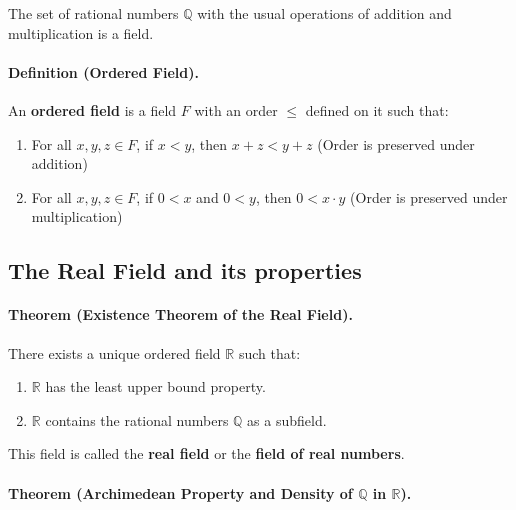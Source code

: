 \documentclass[openany]{book}
\numberwithin{equation}{section}
\begin{document}
        The set of rational numbers $\mathbb{Q}$ with the usual operations of addition and multiplication is a field.
    \par
\par
\paragraph{Definition (Ordered Field).}

    An \textbf{ordered field} is a field $F$ with an order $\leq$ defined on it such that:
    \begin{enumerate}
        \item For all $x, y, z \in F$, if $x < y$, then $x + z < y + z$ (Order is preserved under addition)
        \item For all $x, y, z \in F$, if $0 < x$ and $0 < y$, then $0 < x \cdot y$ (Order is preserved under multiplication)
    \end{enumerate}
\par
\subsection{The Real Field and its properties}
\paragraph{Theorem (Existence Theorem of the Real Field).}

    There exists a unique ordered field $\mathbb{R}$ such that:
    \begin{enumerate}
        \item $\mathbb{R}$ has the least upper bound property.
        \item $\mathbb{R}$ contains the rational numbers $\mathbb{Q}$ as a subfield.
    \end{enumerate}
    This field is called the \textbf{real field} or the \textbf{field of real numbers}.
\par
\paragraph{Theorem (Archimedean Property and Density of $\mathbb{Q}$ in $\mathbb{R}$).}
\end{document}

